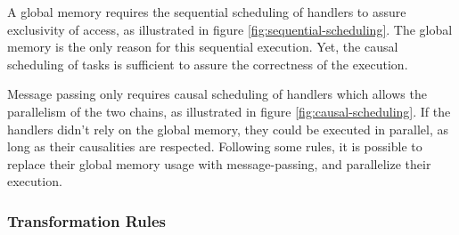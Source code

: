 A global memory requires the sequential scheduling of handlers to assure exclusivity of access, as illustrated in figure \ref{fig:sequential-scheduling}. %
The global memory is the only reason for this sequential execution.
Yet, the causal scheduling of tasks is sufficient to assure the correctness of the execution.

Message passing only requires causal scheduling of handlers which allows the parallelism of the two chains, as illustrated  in figure \ref{fig:causal-scheduling}.
If the handlers didn't rely on the global memory, they could be executed in parallel, as long as their causalities are respected.
Following some rules, it is possible to replace their global memory usage with message-passing, and parallelize their execution.



\subsubsection{Transformation Rules}


